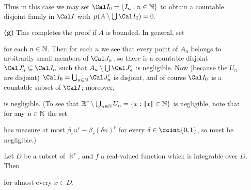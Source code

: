 { 
      
      
Thus in this case we may set $\Cal I_0=\{I_n:n\in\Bbb N\}$ to obtain 
a countable disjoint family in $\Cal I$ with $\mu(A\setminus\bigcup 
\Cal I_0)=0$. 
      
      
\medskip 
      
{\bf (g)}  This completes the proof if $A$ is bounded.   In general, set 
      
      
\noindent for each $n\in\Bbb N$.   Then for each $n$ we see that every 
point of $A_n$ belongs to arbitrarily small members of $\Cal J_n$, so 
there is a countable disjoint $\Cal J'_n\subseteq\Cal J_n$ such that 
$A_n\setminus\bigcup\Cal J'_n$ is negligible.   Now (because the $U_n$ 
are disjoint) $\Cal I_0=\bigcup_{n\in\Bbb N}\Cal J'_n$ is disjoint, and 
of course $\Cal I_0$ is a countable subset of $\Cal I$;  moreover, 
      
      
\noindent is negligible.   (To see that $\Bbb 
R^r\setminus\bigcup_{n\in\Bbb N}U_n=\{x:\|x\|\in\Bbb N\}$ is negligible, 
note that for any $n\in\Bbb N$ the set 
      
      
\noindent has measure at most $\beta_rn^r-\beta_r(\delta n)^r$ for every 
$\delta\in\coint{0,1}$, so must be negligible.) 
}%
      
      
 Let $D$ be 
a subset of $\BbbR^r$, and $f$ a real-valued function which is 
integrable over $D$.   Then 
      
      
\noindent for almost every $x\in D$. 
      
